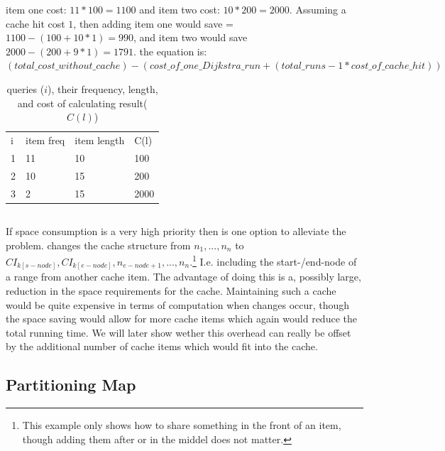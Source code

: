 item one cost: $11*100=1100$ and item two cost: $10*200=2000$. Assuming a cache hit cost $1$, then adding item one would save = $1100-(100+10*1)=990$, and item two would save $2000-(200+9*1)=1791$. the equation is: $(total\_cost\_without\_cache) - (cost\_of\_one\_Dijkstra\_run + (total\_runs-1 * cost\_of\_cache\_hit))$


\begin{table}
\begin{center}
\begin{tabular}{l |l |l |l}
i & item freq & item length & C(l) \\
1 & 11 & 10 & 100 \\
2 & 10 & 15 & 200 \\
3 & 2 & 15 & 2000 \\
\end{tabular}
\end{center}
\caption{\spath queries ($i$), their frequency, length, and cost of calculating result($C(l)$)}
\label{tab:score}
\end{table}





\subsection{\sps}

If space consumption is a very high priority then \sps is one option to alleviate the problem. \sps changes the cache structure from $n_1, ... , n_n$ to $CI_{k\left[s-node\right]},CI_{k\left[e-node\right]}, n_{e-node+1}, ... , n_n$.\footnote{This example only shows how to share something in the front of an item, though adding them after or in the middel does not matter.}
I.e. including the start-/end-node of a range from another cache item. The advantage of doing this is a, possibly large, reduction in the space requirements for the cache. Maintaining such a cache would be quite expensive in terms of computation when changes occur, though the space saving would allow for more cache items which again would reduce the total running time. We will later show wether this overhead can really be offset by the additional number of cache items which would fit into the cache.


\subsection{Partitioning Map}

